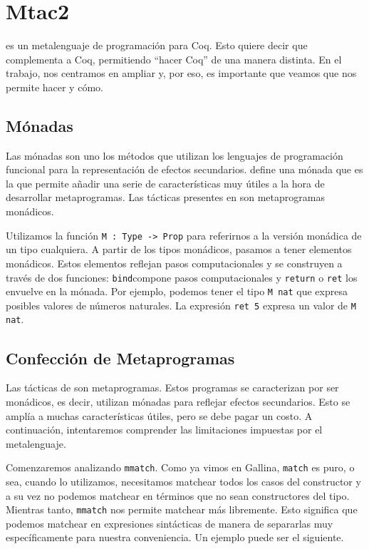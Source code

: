 \chapter{Mtac2}\label{ch:mtac2}

\Mtac \cite{DBLP:journals/pacmpl/KaiserZKRD18} es un metalenguaje de programación para Coq. Esto quiere decir que complementa a Coq, permitiendo ``hacer Coq'' de una manera distinta. En el trabajo, nos centramos en ampliar \Mtac y, por eso, es importante que veamos que nos permite hacer y cómo.

\section{Mónadas}

Las mónadas son uno los métodos que utilizan los lenguajes de programación funcional para la representación de efectos secundarios.
\Mtac define una mónada que es la que permite añadir una serie de características muy útiles a la hora de desarrollar metaprogramas.
Las tácticas presentes en \mtac son metaprogramas monádicos.

Utilizamos la función \lstinline{M : Type -> Prop} para referirnos a la versión monádica de un tipo cualquiera. A partir de los tipos monádicos, pasamos a tener elementos monádicos. Estos elementos reflejan pasos computacionales y se construyen a través de dos funciones: \lstinline{bind}compone pasos computacionales y \lstinline{return} o \lstinline{ret} los envuelve en la mónada. Por ejemplo, podemos tener el tipo \lstinline{M nat} que expresa posibles valores de números naturales. La expresión \lstinline{ret 5} expresa un valor de \lstinline{M nat}.

\section{Confección de Metaprogramas}

Las tácticas de \mtac son metaprogramas.
Estos programas se caracterizan por ser monádicos, es decir, utilizan mónadas para reflejar efectos secundarios.
Esto se amplía a muchas características útiles, pero se debe pagar un costo.
A continuación, intentaremos comprender las limitaciones impuestas por el metalenguaje.

Comenzaremos analizando \lstinline{mmatch}. Como ya vimos en Gallina, \lstinline{match} es puro, o sea, cuando lo utilizamos, necesitamos matchear todos los casos del constructor y a su vez no podemos matchear en términos que no sean constructores del tipo.
Mientras tanto, \lstinline{mmatch} nos permite matchear más libremente.
Esto significa que podemos matchear en expresiones sintácticas de manera de separarlas muy específicamente para nuestra conveniencia.
Un ejemplo puede ser el siguiente.

